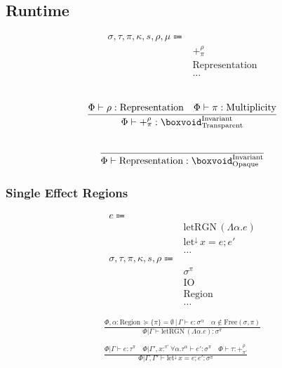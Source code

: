 \documentclass {article}
\begin{document}
\subsection{Runtime}

\begin{align*}
\sigma, \tau, \pi, \kappa, s, \rho, \mu \Coloneqq & \\
& +^\rho_\pi \tag{Pretype}\\
& \text{Representation} \tag {Representation}\\
& \dots
\end{align*}

\begin{gather*}
\\
\frac
{\Phi \vdash \rho : \text{Representation} \quad \Phi \vdash \pi : \text{Multiplicity}}
{\Phi \vdash +^\rho_\pi : \boxvoid^\text{Invariant}_\text{Transparent}} \\
\\
\frac
{}
{\Phi \vdash \text{Representation} : \boxvoid^\text{Invariant}_\text{Opaque}}
\end{gather*}

\subsubsection{Single Effect Regions}
\begin{align*}
e \Coloneqq & \\
& \text{letRGN} \, (\Lambda \alpha. e) \tag{Create Region} \\
& \text{let}^\downarrow \, x = e; e' \tag{Runtime Let} \\
& \dots \\
\sigma, \tau, \pi, \kappa, s, \rho \Coloneqq & \\
& \sigma^\pi \tag{Region Effect} \\
& \text{IO} \tag{IO Region} \\
& \text{Region} \tag{Region} \\
& \dots
\end{align*}

\begin{gather*}
\frac
{\Phi , \alpha : \text{Region} \, \succeq \{ \pi \} = \emptyset \, | \, \Gamma \vdash e : \sigma^\alpha \quad \alpha \notin \text{Free}(\sigma, \pi)}
{\Phi | \Gamma \vdash \text{letRGN} \, (\Lambda \alpha. e) : \sigma^\pi} \\
\\
\frac
{\Phi | \Gamma \vdash e : \tau^\pi \quad \Phi | \Gamma', x :^{\pi'} \forall \alpha. \tau^\alpha \vdash e' : \sigma^\pi \quad \Phi \vdash \tau : +^{\rho}_{\pi'}}
{\Phi | \Gamma, \Gamma' \vdash \text{let}^\downarrow \, x = e; e' : \sigma^\pi}
\end{gather*}
\end{document}
